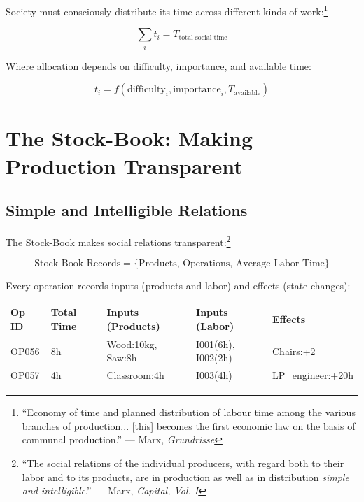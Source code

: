 \documentclass[12pt,a4paper]{article}
\begin{document}
Society must consciously distribute its time across different kinds of work:\footnote{``Economy of time and planned distribution of labour time among the various branches of production... [this] becomes the first economic law on the basis of communal production.'' --- Marx, \textit{Grundrisse}}

\begin{equation}
\sum_{i} t_i = T_{\text{total social time}}
\end{equation}

Where allocation depends on difficulty, importance, and available time:

\begin{equation}
t_i = f(\text{difficulty}_i, \text{importance}_i, T_{\text{available}})
\end{equation}

\section{The Stock-Book: Making Production Transparent}

\subsection{Simple and Intelligible Relations}

The Stock-Book makes social relations transparent:\footnote{``The social relations of the individual producers, with regard both to their labor and to its products, are in production as well as in distribution \textit{simple and intelligible}.'' --- Marx, \textit{Capital, Vol. I}}

\begin{equation}
\text{Stock-Book Records} = \{\text{Products, Operations, Average Labor-Time}\}
\end{equation}

Every operation records inputs (products and labor) and effects (state changes):

\begin{table}[h]
\centering
\small
\begin{tabular}{lllll}
\hline
Op ID & Total Time & Inputs (Products) & Inputs (Labor) & Effects \\
\hline
OP056 & 8h & Wood:10kg, Saw:8h & I001(6h), I002(2h) & Chairs:+2 \\
OP057 & 4h & Classroom:4h & I003(4h) & LP\_engineer:+20h \\
\hline
\end{tabular}
\end{table}
\end{document}

